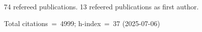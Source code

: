 74 refereed publications. 13 refeered publications as first author.

Total citations~=~4999; h-index~=~37 (2025-07-06)